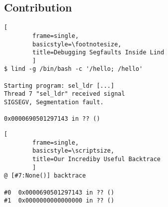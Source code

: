 \documentclass[compress,red]{beamer}
\begin{document}
\subsection{Contribution}

%

\lstset{language=Bash}

\pagebreak
\begin{lstlisting}[
        frame=single,
        basicstyle=\footnotesize,
        title=Debugging Segfaults Inside Lind
        ]
$ lind -g /bin/bash -c '/hello; /hello'

Starting program: sel_ldr [...]
Thread 7 "sel_ldr" received signal
SIGSEGV, Segmentation fault.

0x0000690501297143 in ?? ()
\end{lstlisting}
\newpage

\pagebreak
\begin{lstlisting}[
        frame=single,
        basicstyle=\scriptsize,
        title=Our Incrediby Useful Backtrace
        ]
@ [#7:None()] backtrace

#0  0x0000690501297143 in ?? ()
#1  0x0000000000000000 in ?? ()
\end{lstlisting}
\newpage
\end{document}
